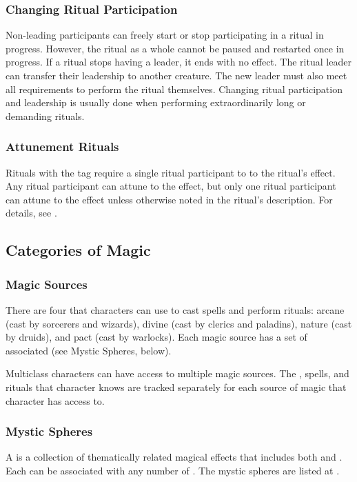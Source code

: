     \subsubsection{Changing Ritual Participation}
      Non-leading participants can freely start or stop participating in a ritual in progress.
      However, the ritual as a whole cannot be paused and restarted once in progress.
      If a ritual stops having a leader, it ends with no effect.
      The ritual leader can transfer their leadership to another creature.
      The new leader must also meet all requirements to perform the ritual themselves.
      Changing ritual participation and leadership is usually done when performing extraordinarily long or demanding rituals.

    \subsubsection{Attunement Rituals}
      Rituals with the  tag require a single ritual participant to  to the ritual's effect.
      Any ritual participant can attune to the effect, but only one ritual participant can attune to the effect unless otherwise noted in the ritual's description.
      For details, see .

  \subsection{Categories of Magic}

    \subsubsection{Magic Sources}
      There are four  that characters can use to cast spells and perform rituals: arcane (cast by sorcerers and wizards), divine (cast by clerics and paladins), nature (cast by druids), and pact (cast by warlocks).
      Each magic source has a set of associated  (see Mystic Spheres, below).

      Multiclass characters can have access to multiple magic sources.
      The , spells, and rituals that character knows are tracked separately for each source of magic that character has access to.

    \subsubsection{Mystic Spheres}
      A  is a collection of thematically related magical effects that includes both  and .
      Each  can be associated with any number of .
      The mystic spheres are listed at .

